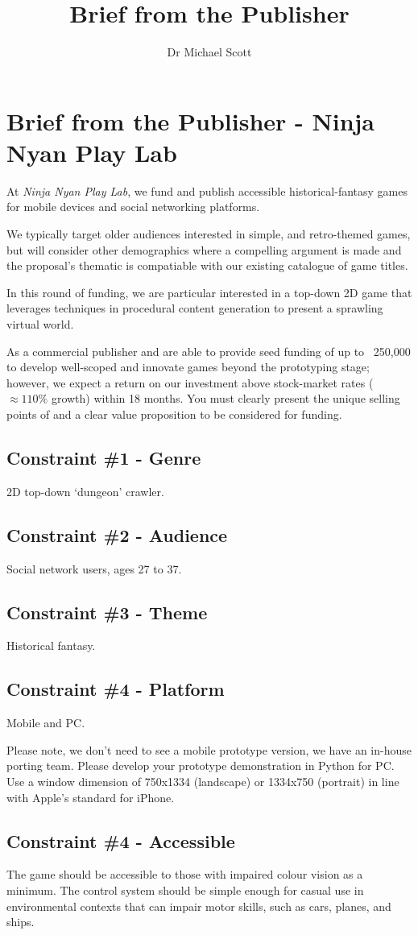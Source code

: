 \documentclass{../../fal_assignment}
\title{Brief from the Publisher}
\author{Dr Michael Scott}
\begin{document}
\section*{Brief from the Publisher - Ninja Nyan Play Lab}

At \textit{Ninja Nyan Play Lab}, we fund and publish accessible historical-fantasy games for mobile devices and social networking platforms. 

We typically target older audiences interested in simple, and retro-themed games, but will consider other demographics where a compelling argument is made and the proposal's thematic is compatiable with our existing catalogue of game titles.

In this round of funding, we are particular interested in a top-down 2D game that leverages techniques in procedural content generation to present a sprawling virtual world.

As a commercial publisher and are able to provide seed funding of up to \textsterling~250,000 to develop well-scoped and innovate games beyond the prototyping stage; however, we expect a return on our investment above stock-market rates ($\approx 110\%$ growth) within 18 months. You must clearly present the unique selling points of and a clear value proposition to be considered for funding. 

\subsection*{Constraint \#1 - Genre}
2D top-down `dungeon' crawler.

\subsection*{Constraint \#2 - Audience}
Social network users, ages 27 to 37.

\subsection*{Constraint \#3 - Theme}
Historical fantasy.

\subsection*{Constraint \#4 - Platform}
Mobile and PC. 

Please note, we don't need to see a mobile prototype version, we have an in-house porting team. Please develop your prototype demonstration in Python for PC. Use a window dimension of 750x1334 (landscape) or 1334x750 (portrait) in line with Apple's standard for iPhone.

\subsection*{Constraint \#4 - Accessible}
The game should be accessible to those with impaired colour vision as a minimum. The control system should be simple enough for casual use in environmental contexts that can impair motor skills, such as cars, planes, and ships.
\end{document}
